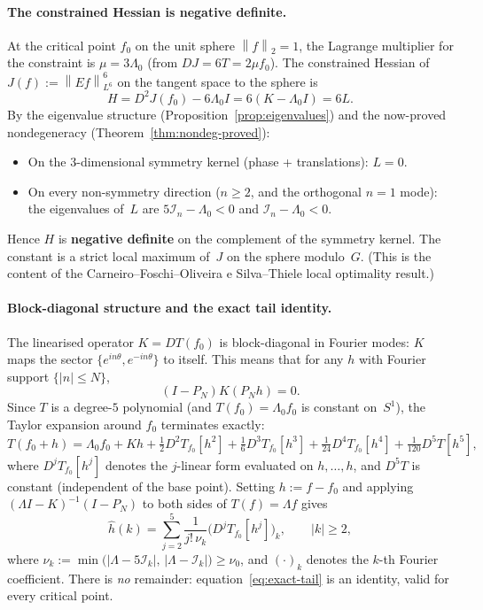 \documentclass[12pt]{article}
\theoremstyle{definition}
\theoremstyle{remark}
\newcommand{\wh}{\widehat}
\newcommand{\norm}[1]{\left\|#1\right\|}
\begin{document}
\paragraph{The constrained Hessian is negative definite.}
At the critical point $f_0$ on the unit sphere $\norm{f}_2=1$, the
Lagrange multiplier for the constraint is $\mu=3\Lambda_0$ (from
$DJ=6T=2\mu f_0$).  The constrained Hessian of
$J(f):=\norm{Ef}_{L^6}^6$ on the tangent space to the sphere is
\[
  H = D^2J(f_0)-6\Lambda_0 I = 6(K-\Lambda_0 I) = 6L.
\]
By the eigenvalue structure (Proposition~\ref{prop:eigenvalues}) and the
now-proved nondegeneracy (Theorem~\ref{thm:nondeg-proved}):
\begin{itemize}
  \item On the 3-dimensional symmetry kernel (phase + translations):
    $L=0$.
  \item On every non-symmetry direction ($n\geq 2$, and the orthogonal
    $n=1$ mode): the eigenvalues of~$L$ are $5\mathcal I_n-\Lambda_0<0$
    and $\mathcal I_n-\Lambda_0<0$.
\end{itemize}
Hence $H$ is \textbf{negative definite} on the complement of the
symmetry kernel.  The constant is a strict local maximum of~$J$ on
the sphere modulo~$G$.  (This is the content of the Carneiro--Foschi--Oliveira
e Silva--Thiele local optimality result.)

\paragraph{Block-diagonal structure and the exact tail identity.}
The linearised operator $K=DT(f_0)$ is block-diagonal in Fourier modes:
$K$ maps the sector $\{e^{in\theta},e^{-in\theta}\}$ to itself.  This
means that for any $h$ with Fourier support $\{|n|\leq N\}$,
\begin{equation}\label{eq:block-diag}
  (I-P_N)K(P_N h) = 0.
\end{equation}
Since $T$ is a degree-$5$ polynomial (and $T(f_0)=\Lambda_0f_0$ is
constant on~$S^1$), the Taylor expansion around $f_0$ terminates
exactly:
\begin{equation}\label{eq:T-taylor}
  T(f_0+h)=\Lambda_0f_0+Kh
  +\tfrac12 D^2T_{f_0}[h^2]
  +\tfrac16 D^3T_{f_0}[h^3]
  +\tfrac{1}{24}D^4T_{f_0}[h^4]
  +\tfrac{1}{120}D^5T[h^5],
\end{equation}
where $D^jT_{f_0}[h^j]$ denotes the $j$-linear form evaluated on
$h,\ldots,h$, and $D^5T$ is constant (independent of the base
point).  Setting $h:=f-f_0$ and applying $(\Lambda I-K)^{-1}(I-P_N)$
to both sides of $T(f)=\Lambda f$ gives
\begin{equation}\label{eq:exact-tail}
  \boxed{
  \wh h(k) = \sum_{j=2}^{5}
    \frac{1}{j!\,\nu_k}\bigl(D^jT_{f_0}[h^j]\bigr)_k,
  \qquad |k|\geq 2,}
\end{equation}
where $\nu_k:=\min\bigl(|\Lambda-5\mathcal I_k|,\,
|\Lambda-\mathcal I_k|\bigr)\geq\nu_0$, and
$(\cdot)_k$ denotes the $k$-th Fourier coefficient.  There is
\emph{no} remainder: equation~\eqref{eq:exact-tail} is an identity,
valid for every critical point.
\end{document}

